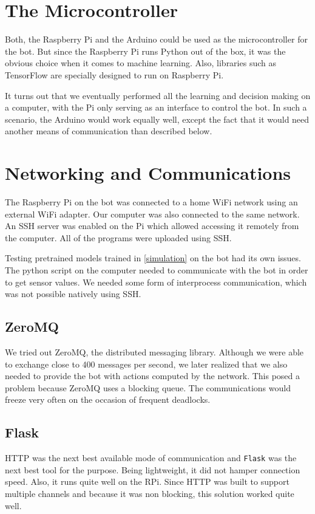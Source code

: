 \documentclass[12pt]{extreport}
\theoremstyle{plain}
\theoremstyle{definition}
\begin{document}
\section{The Microcontroller}
Both, the Raspberry Pi and the Arduino could be used as the microcontroller for the bot. But since the Raspberry Pi runs Python out of the box, it was the obvious choice when it comes to machine learning. Also, libraries such as TensorFlow are specially designed to run on Raspberry Pi.

It turns out that we eventually performed all the learning and decision making on a computer, with the Pi only serving as an interface to control the bot. In such a scenario, the Arduino would work equally well, except the fact that it would need another means of communication than described below.

\section{Networking and Communications}
The Raspberry Pi on the bot was connected to a home WiFi network using an external WiFi adapter. Our computer was also connected to the same network.
An SSH server was enabled on the Pi which allowed accessing it remotely from the computer. All of the programs were uploaded using SSH.

Testing pretrained models trained in \autoref{simulation} on the bot had its own issues. The python script on the computer needed to communicate with the bot in order to get sensor values. We needed some form of interprocess communication, which was not possible natively using SSH.

\subsection{ZeroMQ}
We tried out ZeroMQ, the distributed messaging library. Although we were able to exchange close to 400 messages per second, we later realized that we also needed to provide the bot with actions computed by the network. This posed a problem because ZeroMQ uses a blocking queue. The communications would freeze very often on the occasion of frequent deadlocks.

\subsection{Flask}
HTTP was the next best available mode of communication and \texttt{Flask} was the next best tool for the purpose. Being lightweight, it did not hamper connection speed. Also, it runs quite well on the RPi. Since HTTP was built to support multiple channels and because it was non blocking, this solution worked quite well.
\end{document}
